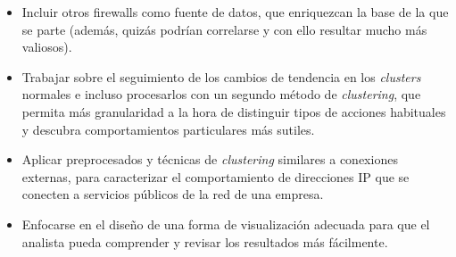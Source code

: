 \begin{itemize}

\item Incluir otros firewalls como fuente de datos, que enriquezcan la base de la que se parte (además, quizás podrían correlarse y con ello resultar mucho más valiosos).

\item Trabajar sobre el seguimiento de los cambios de tendencia en los \emph{clusters} normales e incluso procesarlos con un segundo método de \emph{clustering}, que permita más granularidad a la hora de distinguir tipos de acciones habituales y descubra comportamientos particulares más sutiles.

\item Aplicar preprocesados y técnicas de \emph{clustering} similares a conexiones externas, para caracterizar el comportamiento de direcciones IP que se conecten a servicios públicos de la red de una empresa.

\item Enfocarse en el diseño de una forma de visualización adecuada para que el analista pueda comprender y revisar los resultados más fácilmente.

\end{itemize}
